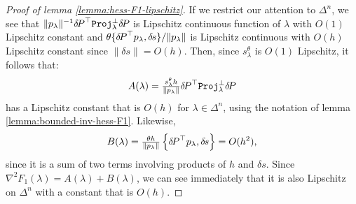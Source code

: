 \documentclass[smallcondensed]{svjour3}
\begin{document}
\begin{proof}[Proof of lemma \ref{lemma:hess-F1-lipschitz}]
  If we restrict our attention to $\Delta^n$, we see that
  $\|p_\lambda\|^{-1} {\delta \hspace{-0.14em} P}^\top \mathtt{Proj}_\lambda^\perp {\delta \hspace{-0.14em} P}$ is
  Lipschitz continuous function of $\lambda$ with $O(1)$ Lipschitz
  constant and $\theta \{{{\delta \hspace{-0.14em} P}}^\top p_\lambda, {\delta \hspace{-0.1em} s}\} /\|p_{\lambda}\|$
  is Lipschitz continuous with $O(h)$ Lipschitz constant since
  $\|\delta s\| = O(h)$. Then, since $s^\theta_\lambda$ is $O(1)$
  Lipschitz, it follows that:
  \begin{equation}
    A(\lambda) = \tfrac{s^\theta_\lambda h}{\|p_\lambda\|} {\delta \hspace{-0.14em} P}^\top
    \mathtt{Proj}^\perp_\lambda {\delta \hspace{-0.14em} P}
  \end{equation}
  has a Lipschitz constant that is $O(h)$ for $\lambda \in \Delta^n$,
  using the notation of lemma
  \ref{lemma:bounded-inv-hess-F1}. Likewise,
  \begin{equation}
    B(\lambda) = \tfrac{\theta h}{\|p_\lambda\|} \left\{{\delta \hspace{-0.14em} P}^\top
      p_\lambda, {\delta \hspace{-0.1em} s}\right\} = O(h^2),
  \end{equation}
  since it is a sum of two terms involving products of $h$ and
  $\delta s$. Since $\nabla^2 F_1(\lambda) = A(\lambda) + B(\lambda)$,
  we can see immediately that it is also Lipschitz on $\Delta^n$ with
  a constant that is $O(h)$.
\end{proof}
\end{document}
